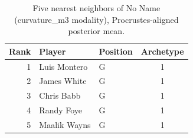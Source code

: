 \begin{table}[htbp]
  \centering\small
  \begin{tabular}{rllc}
    \toprule
    Rank & Player & Position & Archetype \\
    \midrule
    1 & Luis Montero & G & 1 \\
    2 & James White & G & 1 \\
    3 & Chris Babb & G & 1 \\
    4 & Randy Foye & G & 1 \\
    5 & Maalik Wayns & G & 1 \\
    \bottomrule
  \end{tabular}
  \caption{Five nearest neighbors of No Name (curvature_m3 modality), Procrustes-aligned posterior mean.}
  \label{tab:No_Name_neighbors_curvature_m3}
\end{table}

